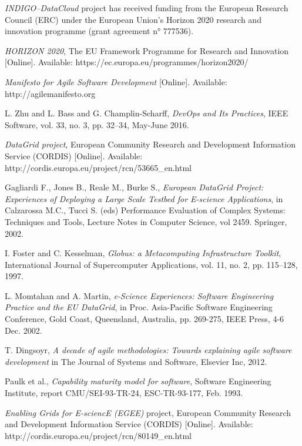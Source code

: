 \documentclass[journal]{IEEEtran}
\begin{document}
{\sl INDIGO--DataCloud} project has received funding from the European Research
Council (ERC) under the European Union's Horizon 2020 research and innovation
programme (grant agreement n° 777536).

\begin{thebibliography}{1}

\emph{HORIZON 2020}, The EU Framework Programme for Research and Innovation [Online]. Available: https://ec.europa.eu/programmes/horizon2020/

\emph{Manifesto for Agile Software Development} [Online]. Available: http://agilemanifesto.org

L. Zhu and L. Bass and G. Champlin-Scharff, \emph{DevOps and Its Practices},
IEEE Software, vol. 33, no. 3, pp. 32--34, May-June 2016.

\emph{DataGrid project}, European Community Research and Development
Information Service (CORDIS) [Online]. Available: http://cordis.europa.eu/project/rcn/53665\_en.html

Gagliardi F., Jones B., Reale M., Burke S., \emph{European DataGrid Project: Experiences of Deploying a Large Scale Testbed for E-science Applications},
in Calzarossa M.C., Tucci S. (eds) Performance Evaluation of Complex Systems: Techniques and Tools, Lecture Notes in Computer Science, vol 2459. Springer, 2002.

I. Foster and C. Kesselman, \emph{Globus: a Metacomputing Infrastructure
Toolkit}, International Journal of Supercomputer Applications, vol. 11, no. 2,
pp. 115–128, 1997.

L. Momtahan and A. Martin, \emph{e-Science Experiences: Software Engineering
Practice and the EU DataGrid}, in Proc. Asia-Pacific Software Engineering
Conference, Gold Coast, Queensland, Australia, pp. 269-275, IEEE Press,
4-6 Dec. 2002.

T. Dingsoyr, \emph{A decade of agile methodologies: Towards explaining agile
software development} in The Journal of Systems and Software, Elsevier Inc,
2012.

Paulk et al., \emph{Capability maturity model for software}, Software
Engineering Institute, report CMU/SEI-93-TR-24, ESC-TR-93-177, Feb. 1993.

\emph{Enabling Grids for E-sciencE (EGEE)} project, European Community
Research and Development Information Service (CORDIS) [Online]. Available:
http://cordis.europa.eu/project/rcn/80149\_en.html


\end{thebibliography}
\end{document}

